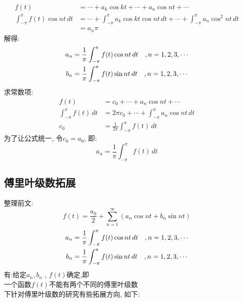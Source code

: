 \begin{align*}
                                     f(t) &= \cdots + a_k \cos kt +  \cdots  + a_n \cos nt +  \cdots  \\
    \int_{- \pi}^{\pi}  f(t) \cos nt \,dt &= \cdots   + \int_{- \pi}^{\pi} a_k \cos kt  \cos nt \,dt + \cdots + \int_{- \pi}^{\pi} a_n \cos^2 nt  \,dt   \\
                                          &= a_n \pi
\end{align*}
解得:
\begin{align*}
   a_n  &= \frac{1}{\pi} \int_{- \pi}^{\pi}  f(t) \cos nt \,dt \hspace*{1em} , n = 1, 2, 3, \cdots  \\
   b_n  &= \frac{1}{\pi} \int_{- \pi}^{\pi}  f(t) \sin nt \,dt \hspace*{1em} , n = 1, 2, 3, \cdots     
\end{align*}
求常数项:
\begin{align*}
                            f(t)  &= c_0 + \cdots  +  a_n \cos nt +  \cdots  \\
    \int_{- \pi}^{\pi}  f(t) \,dt &= 2\pi c_0  + \cdots + \int_{- \pi}^{\pi} a_n \cos nt  \,dt   \\
                             c_0  &= \frac{1}{2\pi} \int_{- \pi}^{\pi}  f(t) \,dt
\end{align*}
为了让公式统一, 令$c_0 = a_0$, 即:
\[ a_n = \frac{1}{\pi} \int_{- \pi}^{\pi}  f(t)  \,dt \]


\subsection{\LARGE 傅里叶级数拓展}
整理前文:
\[ f(t) = \frac{a_0}{2} + \sum_{n = 1}^{\infty} (a_n \cos nt  + b_n \sin nt) \]
\begin{align*}
   a_n  &= \frac{1}{\pi} \int_{- \pi}^{\pi}  f(t) \cos nt \,dt \hspace*{1em} , n = 1, 2, 3, \cdots  \\
   b_n  &= \frac{1}{\pi} \int_{- \pi}^{\pi}  f(t) \sin nt \,dt \hspace*{1em} , n = 1, 2, 3, \cdots     
\end{align*}
有:给定$a_n, b_n$ , $f(t)$确定,即\\
一个函数$f(t)$不能有两个不同的傅里叶级数\\
下针对傅里叶级数的研究有些拓展方向, 如下:
